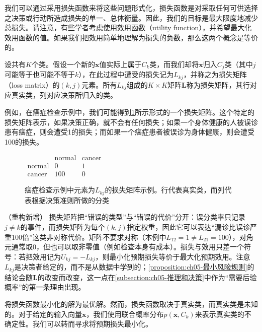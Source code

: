 \documentclass[../../main.tex]{subfiles}
\begin{document}
我们可以通过采用损失函数来将这些问题形式化，损失函数是对采取任何可供选择之决策或行动所造成损失的单一、总体衡量。因此，我们的目标是最大限度地减少总损失。请注意，有些学者考虑使用效用函数（utility function），并希望最大化效用函数的值。如果我们把效用简单地理解为损失的负数，那么这两个概念是等价的。

\begin{definition}[损失矩阵]\label{definition:ch05-损失矩阵}
设共有$K$个类。假设一个新的$\boldsymbol{x}$值实际上属于$C_k$类，而我们却将$\boldsymbol{x}$归入$C_j$类（其中$j$可能等于也可能不等于$k$），在此过程中遭受的损失记为$L_{kj}$，并称之为损失矩阵（loss matrix）的$(k,j)$元素。所有$L_{kj}$组成的$K\times K$矩阵$\boldsymbol{L}$称为损失矩阵，其行对应真实类，列对应决策所归入的类。
\end{definition}

例如，在癌症检查示例中，我们可能得到\cref{figure:ch05-损失矩阵}所示形式的一个损失矩阵。这个特定的损失矩阵表示，如果决策正确，就不会有任何损失；如果一个身体健康的人被误诊患有癌症，则会遭受1的损失；而如果一个癌症患者被误诊为身体健康，则会遭受100的损失。

\begin{figure}[htbp]
  \centering
  $\begin{array}{c|cc}
    & \text{normal} & \text{cancer}\\\hline
    \text{normal} & 0 & 1\\
    \text{cancer} & 100 & 0
  \end{array}$
  \caption{癌症检查示例中元素为$L_{kj}$的损失矩阵示例。行代表真实类，而列代表根据决策准则所做的分类}
  \label{figure:ch05-损失矩阵}
\end{figure}

\begin{remark}（重构新增）
损失矩阵把“错误的类型”与“错误的代价”分开：误分类率只记录$j\neq k$的事件，而损失矩阵为每个$(k,j)$指定权重，因此它可以表达“漏诊比误诊严重100倍”这类非对称代价。矩阵不要求对称（本例中$L_{12}=1\neq L_{21}=100$），对角元通常取0，但也可以取非零值（例如检查本身有成本）。损失与效用只差一个符号：若把效用记为$U_{kj}=-L_{kj}$，则最小化预期损失等价于最大化预期效用。注意$L_{kj}$是决策者给定的，而不是从数据中学到的；\cref{proposition:ch05-最小风险规则}的结论会随$\boldsymbol{L}$的改变而改变，这一点在\cref{subsection:ch05-推理和决策}中作为“需要后验概率”的第一条理由出现。
\end{remark}

将损失函数最小化的解为最优解。然而，损失函数取决于真实类，而真实类是未知的。对于给定的输入向量$\boldsymbol{x}$，我们使用联合概率分布$p(\boldsymbol{x},C_k)$来表示真实类的不确定性。我们可以转而寻求将预期损失最小化。
\end{document}
